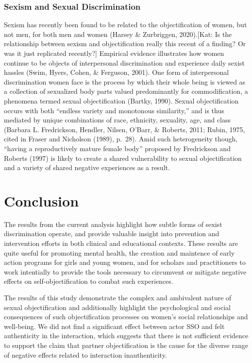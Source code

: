 \documentclass[man]{apa6}
\begin{document}
\subsubsection{Sexism and Sexual
Discrimination}\label{sexism-and-sexual-discrimination}

Sexism has recently been found to be related to the objectification of
women, but not men, for both men and women (Harsey \& Zurbriggen,
2020).{[}Kat: Is the relationship between sexism and objectification
really this recent of a finding? Or was it just replicated recently?{]}
Empirical evidence illustrates how women continue to be objects of
interpersonal discrimination and experience daily sexist hassles (Swim,
Hyers, Cohen, \& Ferguson, 2001). One form of interpersonal
discrimination women face is the process by which their whole being is
viewed as a collection of sexualized body parts valued predominantly for
commodification, a phenomena termed sexual objectification (Bartky,
1990). Sexual objectification occurs with both \enquote{endless variety
and monotonous similarity,} and is thus mediated by unique combinations
of race, ethnicity, sexuality, age, and class (Barbara L. Fredrickson,
Hendler, Nilsen, O'Barr, \& Roberts, 2011; Rubin, 1975, cited in Fraser
and Nicholson (1989), p.~28). Amid such heterogeneity though,
\enquote{having a reproductively mature female body} proposed by
Fredrickson and Roberts (1997) is likely to create a shared
vulnerability to sexual objectification and a variety of shared negative
experiences as a result.

\section{Conclusion}\label{conclusion}

The results from the current analysis highlight how subtle forms of
sexist discrimination operate, and provide valuable insight into
prevention and intervention efforts in both clinical and educational
contexts. These results are quite useful for promoting mental health,
the creation and maintence of early action programs for girls and young
women, and for scholars and practitioners to work intentially to provide
the tools necessary to circumvent or mitigate negative effects on
self-objectification to combat such experiences.

The results of this study demonstrate the complex and ambivalent nature
of sexual objectification and additionally highlight the psychological
and social consequences of such objectification processes on women's
social relationships and well-being. We did not find a significant
effect between actor SSO and felt authenticity in the interaction, which
suggests that there is not sufficient evidence to support the claim that
partner objectification is the cause for the diverse range of negative
effects related to interaction inauthenticity.
\end{document}
